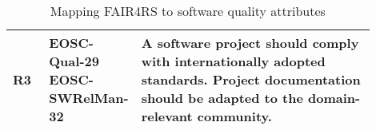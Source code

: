 \begin{table}[]
\begin{tabular}{|p{0.1\linewidth}|p{0.15\linewidth}|p{0.65\linewidth}|}
    R3 &
    \makecell{EOSC-Qual-29 \\ EOSC-SWRelMan-32} &
    A software project should comply with internationally adopted standards. Project documentation should be adapted to the domain-relevant community. \\ \hline

  \end{tabular}
\caption{Mapping FAIR4RS to software quality attributes}
\label{tab:cfs}
\end{table}



















